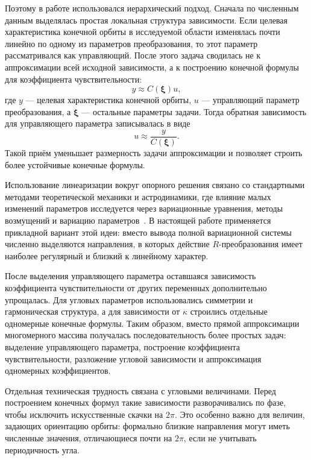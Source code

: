 Поэтому в работе использовался иерархический подход. Сначала по численным данным выделялась простая локальная структура зависимости. Если целевая характеристика конечной орбиты в исследуемой области изменялась почти линейно по одному из параметров преобразования, то этот параметр рассматривался как управляющий. После этого задача сводилась не к аппроксимации всей исходной зависимости, а к построению конечной формулы для коэффициента чувствительности:
\begin{equation}
y \approx C(\boldsymbol\xi) u,
\end{equation}
где \(y\) --- целевая характеристика конечной орбиты, \(u\) --- управляющий параметр преобразования, а \(\boldsymbol\xi\) --- остальные параметры задачи. Тогда обратная зависимость для управляющего параметра записывалась в виде
\begin{equation}
u \approx \frac{y}{C(\boldsymbol\xi)} .
\end{equation}
Такой приём уменьшает размерность задачи аппроксимации и позволяет строить более устойчивые конечные формулы.

Использование линеаризации вокруг опорного решения связано со стандартными методами теоретической механики и астродинамики, где влияние малых изменений параметров исследуется через вариационные уравнения, методы возмущений и вариацию параметров~\cite{battin_astrodynamics_1999}. В настоящей работе применяется прикладной вариант этой идеи: вместо вывода полной вариационной системы численно выделяются направления, в которых действие \(R\)-преобразования имеет наиболее регулярный и близкий к линейному характер.

После выделения управляющего параметра оставшаяся зависимость коэффициента чувствительности от других переменных дополнительно упрощалась. Для угловых параметров использовались симметрии и гармоническая структура, а для зависимости от \(\kappa\) строились отдельные одномерные конечные формулы. Таким образом, вместо прямой аппроксимации многомерного массива получалась последовательность более простых задач: выделение управляющего параметра, построение коэффициента чувствительности, разложение угловой зависимости и аппроксимация одномерных коэффициентов.

Отдельная техническая трудность связана с угловыми величинами. Перед построением конечных формул такие зависимости разворачивались по фазе, чтобы исключить искусственные скачки на \(2\pi\). Это особенно важно для величин, задающих ориентацию орбиты: формально близкие направления могут иметь численные значения, отличающиеся почти на \(2\pi\), если не учитывать периодичность угла.

